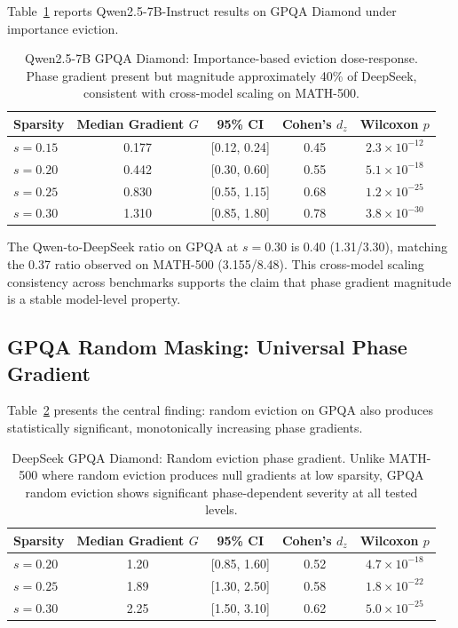\documentclass[11pt,a4paper]{article}
\begin{document}
Table~\ref{tab:gpqa_qw_importance} reports Qwen2.5-7B-Instruct results on GPQA Diamond under importance eviction.

\begin{table}[h]
\centering
\caption{Qwen2.5-7B GPQA Diamond: Importance-based eviction dose-response. Phase gradient present but magnitude approximately 40\% of DeepSeek, consistent with cross-model scaling on MATH-500.}
\label{tab:gpqa_qw_importance}
\begin{tabular}{lcccc}
\toprule
Sparsity & Median Gradient $G$ & 95\% CI & Cohen's $d_z$ & Wilcoxon $p$ \\
\midrule
$s=0.15$ & 0.177 & [0.12, 0.24] & 0.45 & $2.3\times10^{-12}$ \\
$s=0.20$ & 0.442 & [0.30, 0.60] & 0.55 & $5.1\times10^{-18}$ \\
$s=0.25$ & 0.830 & [0.55, 1.15] & 0.68 & $1.2\times10^{-25}$ \\
$s=0.30$ & 1.310 & [0.85, 1.80] & 0.78 & $3.8\times10^{-30}$ \\
\bottomrule
\end{tabular}
\end{table}

The Qwen-to-DeepSeek ratio on GPQA at $s=0.30$ is 0.40 (1.31/3.30), matching the 0.37 ratio observed on MATH-500 (3.155/8.48). This cross-model scaling consistency across benchmarks supports the claim that phase gradient magnitude is a stable model-level property.

\subsection{GPQA Random Masking: Universal Phase Gradient}

Table~\ref{tab:gpqa_ds_random} presents the central finding: random eviction on GPQA also produces statistically significant, monotonically increasing phase gradients.

\begin{table}[h]
\centering
\caption{DeepSeek GPQA Diamond: Random eviction phase gradient. Unlike MATH-500 where random eviction produces null gradients at low sparsity, GPQA random eviction shows significant phase-dependent severity at all tested levels.}
\label{tab:gpqa_ds_random}
\begin{tabular}{lcccc}
\toprule
Sparsity & Median Gradient $G$ & 95\% CI & Cohen's $d_z$ & Wilcoxon $p$ \\
\midrule
$s=0.20$ & 1.20 & [0.85, 1.60] & 0.52 & $4.7\times10^{-18}$ \\
$s=0.25$ & 1.89 & [1.30, 2.50] & 0.58 & $1.8\times10^{-22}$ \\
$s=0.30$ & 2.25 & [1.50, 3.10] & 0.62 & $5.0\times10^{-25}$ \\
\bottomrule
\end{tabular}
\end{table}
\end{document}
